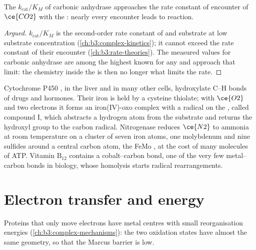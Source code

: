 \begin{proposition}\label{prop:b3:bioinorganic:carbonic-anhydrase}
The  $k_{\mathrm{cat}}/K_M$ of carbonic anhydrase approaches the rate
constant of encounter of $\ce{CO2}$ with the : nearly every encounter leads to
reaction.
\end{proposition}

\begin{proof}[Argued]
$k_{\mathrm{cat}}/K_M$ is the second-order rate constant of  and substrate at low substrate
concentration (\cref{ch:b3:complex-kinetics}); it cannot exceed the
 rate constant of their encounter
(\cref{ch:b3:rate-theories}). The measured values for carbonic anhydrase are
among the highest known for any  and approach that limit: the chemistry
inside the  is then no longer what limits the rate.
\end{proof}

Cytochrome P450 , in the liver and in many other cells, hydroxylate C--H
bonds of drugs and hormones. Their  iron is held by a cysteine thiolate; with
$\ce{O2}$ and two electrons it forms an iron(IV)-oxo complex with a radical on the
, called compound I, which abstracts a hydrogen atom from the
substrate and returns the hydroxyl group to the carbon radical. Nitrogenase
reduces $\ce{N2}$ to ammonia at room temperature on a cluster of seven iron atoms,
one molybdenum and nine sulfides around a central carbon atom, the FeMo
, at the cost of many molecules of ATP. Vitamin $\mathrm{B_{12}}$ contains a
cobalt--carbon bond, one of the very few metal--carbon bonds in biology, whose
homolysis starts radical rearrangements.

\section{Electron transfer and energy}

Proteins that only move electrons have metal centres with small
reorganisation energies (\cref{ch:b3:complex-mechanisms}): the two oxidation
states have almost the same geometry, so that the Marcus barrier is low.

